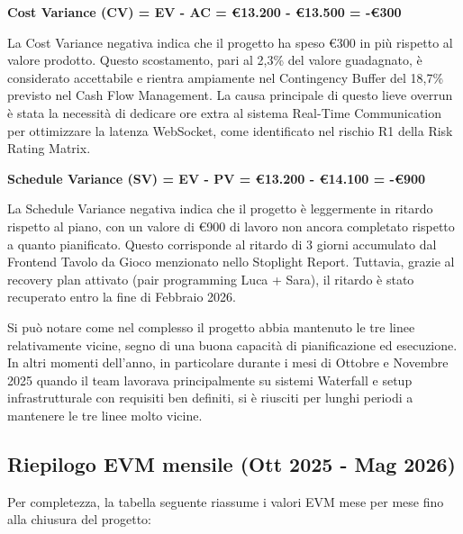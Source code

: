 \textbf{Cost Variance (CV) = EV - AC = €13.200 - €13.500 = -€300}

La Cost Variance negativa indica che il progetto ha speso €300 in più rispetto al valore prodotto. Questo scostamento, pari al 2,3\% del valore guadagnato, è considerato accettabile e rientra ampiamente nel Contingency Buffer del 18,7\% previsto nel Cash Flow Management. La causa principale di questo lieve overrun è stata la necessità di dedicare ore extra al sistema Real-Time Communication per ottimizzare la latenza WebSocket, come identificato nel rischio R1 della Risk Rating Matrix.

\textbf{Schedule Variance (SV) = EV - PV = €13.200 - €14.100 = -€900}

La Schedule Variance negativa indica che il progetto è leggermente in ritardo rispetto al piano, con un valore di €900 di lavoro non ancora completato rispetto a quanto pianificato. Questo corrisponde al ritardo di 3 giorni accumulato dal Frontend Tavolo da Gioco menzionato nello Stoplight Report. Tuttavia, grazie al recovery plan attivato (pair programming Luca + Sara), il ritardo è stato recuperato entro la fine di Febbraio 2026.

Si può notare come nel complesso il progetto abbia mantenuto le tre linee relativamente vicine, segno di una buona capacità di pianificazione ed esecuzione. In altri momenti dell'anno, in particolare durante i mesi di Ottobre e Novembre 2025 quando il team lavorava principalmente su sistemi Waterfall e setup infrastrutturale con requisiti ben definiti, si è riusciti per lunghi periodi a mantenere le tre linee molto vicine.

\subsection{Riepilogo EVM mensile (Ott 2025 - Mag 2026)}

Per completezza, la tabella seguente riassume i valori EVM mese per mese fino alla chiusura del progetto:

